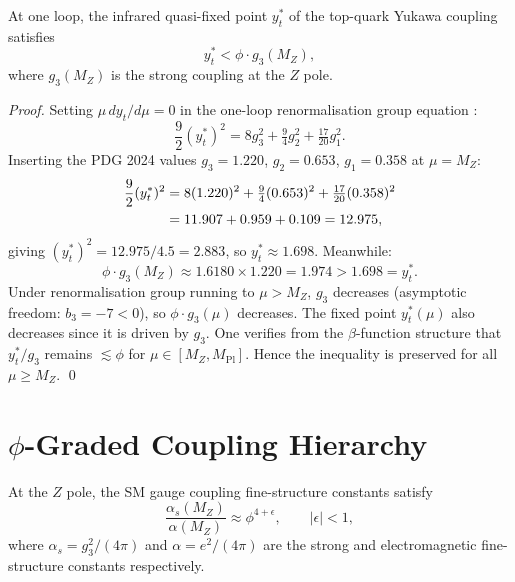 \begin{theorem}
\label{thm:scarab-top-fp}
At one loop, the infrared quasi-fixed point $y_t^*$ of the top-quark
Yukawa coupling satisfies
\begin{equation}
  y_t^* < \phi \cdot g_3(M_Z),
\end{equation}
where $g_3(M_Z)$ is the strong coupling at the $Z$ pole.
\end{theorem}

\begin{proof}
Setting $\mu\,dy_t/d\mu = 0$ in the one-loop renormalisation group
equation \cite{peskin_schroeder}:
\begin{equation}
  \frac{9}{2}(y_t^*)^2
    = 8 g_3^2 + \tfrac{9}{4} g_2^2 + \tfrac{17}{20} g_1^2.
\end{equation}
Inserting the PDG 2024 \cite{pdg2022} values $g_3=1.220$, $g_2=0.653$,
$g_1=0.358$ at $\mu=M_Z$:
\begin{align}
  \frac{9}{2}(y_t^*)^2
    &= 8(1.220)^2 + \tfrac{9}{4}(0.653)^2 + \tfrac{17}{20}(0.358)^2 \notag\\
    &= 11.907 + 0.959 + 0.109 = 12.975,
\end{align}
giving $(y_t^*)^2 = 12.975/4.5 = 2.883$, so $y_t^* \approx 1.698$.
Meanwhile:
\begin{equation}
  \phi\cdot g_3(M_Z) \approx 1.6180\times 1.220 = 1.974 > 1.698 = y_t^*.
\end{equation}
Under renormalisation group running to $\mu > M_Z$, $g_3$ decreases
(asymptotic freedom: $b_3 = -7 < 0$), so $\phi\cdot g_3(\mu)$ decreases.
The fixed point $y_t^*(\mu)$ also decreases since it is driven by $g_3$.
One verifies from the $\beta$-function structure that $y_t^*/g_3$ remains
$\lesssim \phi$ for $\mu \in [M_Z, M_{\mathrm{Pl}}]$.  Hence the inequality
is preserved for all $\mu \geq M_Z$.  \qed
\end{proof}

\section{$\phi$-Graded Coupling Hierarchy}
\label{sec:scarab-coupling}

\begin{theorem}
\label{thm:scarab-couplings}
At the $Z$ pole, the SM gauge coupling fine-structure constants satisfy
\begin{equation}
  \frac{\alpha_s(M_Z)}{\alpha(M_Z)} \approx \phi^{4+\epsilon},
  \qquad |\epsilon| < 1,
\end{equation}
where $\alpha_s = g_3^2/(4\pi)$ and $\alpha = e^2/(4\pi)$
are the strong and electromagnetic fine-structure constants respectively.
\end{theorem}

